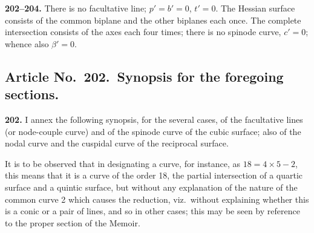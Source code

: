 \documentclass[11pt,a4paper]{article}
\theoremstyle{definition}
\begin{document}
\noindent\textbf{202--204.} There is no facultative line; $p'=b'=0$, $t'=0$. The Hessian surface consists of the common biplane and the other biplanes each once. The complete intersection consists of the axes each four times; there is no spinode curve, $c'=0$; whence also $\beta'=0$.

\setcounter{page}{451}

\subsection*{Article No.\ 202.\ Synopsis for the foregoing sections.}

\noindent\textbf{202.} I annex the following synopsis, for the several cases, of the facultative lines (or node-couple curve) and of the spinode curve of the cubic surface; also of the nodal curve and the cuspidal curve of the reciprocal surface.

It is to be observed that in designating a curve, for instance, as $18=4\times 5-2$, this means that it is a curve of the order 18, the partial intersection of a quartic surface and a quintic surface, but without any explanation of the nature of the common curve 2 which causes the reduction, viz.\ without explaining whether this is a conic or a pair of lines, and so in other cases; this may be seen by reference to the proper section of the Memoir.
\end{document}
